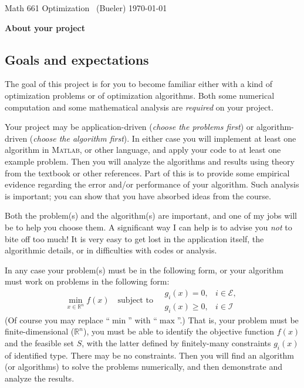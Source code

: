 \documentclass[12pt]{amsart}
\newcommand{\normalspacing}{\renewcommand{\baselinestretch}{1.05}
        \tiny\normalsize}
\newcommand{\RR}{\mathbb{R}}
\newcommand{\Matlab}{\textsc{Matlab}\xspace}
\begin{document}
\scriptsize \phantom{bob} \vspace{-0.3in}
\noindent Math 661 Optimization \, (Bueler) \hfill  \today
\normalsize\bigskip
\normalspacing

\Large\centerline{\textbf{About your project}}
\normalsize

\bigskip\medskip
\thispagestyle{empty}
\normalspacing

\subsection*{Goals and expectations} The goal of this project is for you to become familiar either with a kind of optimization problems or of optimization algorithms.  Both some numerical computation and some mathematical analysis are \emph{required} on your project.

Your project may be application-driven (\emph{choose the problems first}) or algorithm-driven (\emph{choose the algorithm first}).  In either case you will implement at least one algorithm in \Matlab, or other language, and apply your code to at least one example problem.  Then you will analyze the algorithms and results using theory from the textbook or other references.  Part of this is to provide some empirical evidence regarding the error and/or performance of your algorithm.  Such analysis is important; you can show that you have absorbed ideas from the course.

Both the problem(s) and the algorithm(s) are important, and one of my jobs will be to help you choose them.  A significant way I can help is to advise you \emph{not} to bite off too much!  It is very easy to get lost in the application itself, the algorithmic details, or in difficulties with codes or analysis.

In any case your problem(s) must be in the following form, or your algorithm must work on problems in the following form:
    $$\min_{x\in \RR^n} f(x) \quad \text{subject to} \quad \begin{matrix}
                                                      g_i(x) = 0, & i \in \mathcal{E}, \\
                                                      g_i(x) \ge 0, & i \in \mathcal{I}
                                                      \end{matrix}$$
(Of course you may replace ``$\min$'' with ``$\max$''.)  That is, your problem must be finite-dimensional ($\RR^n$), you must be able to identify the objective function $f(x)$ and the feasible set $S$, with the latter defined by finitely-many constraints $g_i(x)$ of identified type.  There may be no constraints.  Then you will find an algorithm (or algorithms) to solve the problems numerically, and then demonstrate and analyze the results.
\end{document}
